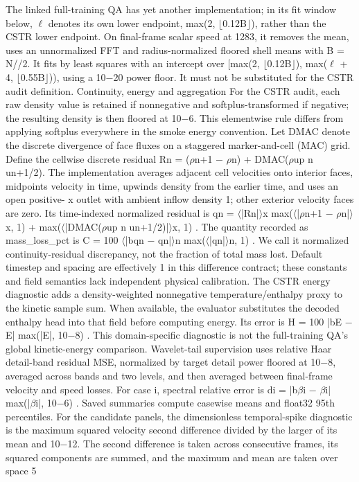 \documentclass[11pt]{article}
\begin{document}
The linked full-training QA has yet another implementation; in its fit window below, \ensuremath{\ell} denotes its
own lower endpoint, max(2, \ensuremath{\lfloor}0.12B\ensuremath{\rfloor}), rather than the CSTR lower endpoint. On final-frame scalar
speed at 1283, it removes the mean, uses an unnormalized FFT and radius-normalized floored shell
means with B = N//2. It fits by least squares with an intercept over [max(2, \ensuremath{\lfloor}0.12B\ensuremath{\rfloor}), max(\ensuremath{\ell} +
4, \ensuremath{\lfloor}0.55B\ensuremath{\rfloor})), using a 10\ensuremath{-}20 power floor. It must not be substituted for the CSTR audit definition.
Continuity, energy and aggregation
For the CSTR audit, each raw density value is retained if nonnegative and softplus-transformed if
negative; the resulting density is then floored at 10\ensuremath{-}6. This elementwise rule differs from applying
softplus everywhere in the smoke energy convention. Let DMAC denote the discrete divergence of
face fluxes on a staggered marker-and-cell (MAC) grid. Define the cellwise discrete residual
Rn = (\ensuremath{\rho}n+1 \ensuremath{-} \ensuremath{\rho}n) + DMAC(\ensuremath{\rho}up
n un+1/2).
The implementation averages adjacent cell velocities onto interior faces, midpoints velocity in time,
upwinds density from the earlier time, and uses an open positive- x outlet with ambient inflow
density 1; other exterior velocity faces are zero. Its time-indexed normalized residual is
qn = \ensuremath{\langle}|Rn|\ensuremath{\rangle}x
max(\ensuremath{\langle}|\ensuremath{\rho}n+1 \ensuremath{-} \ensuremath{\rho}n|\ensuremath{\rangle}x, 1) + max(\ensuremath{\langle}|DMAC(\ensuremath{\rho}up
n un+1/2)|\ensuremath{\rangle}x, 1) .
The quantity recorded as mass\_loss\_pct is
C = 100 \ensuremath{\langle}|bqn \ensuremath{-} qn|\ensuremath{\rangle}n
max(\ensuremath{\langle}|qn|\ensuremath{\rangle}n, 1) .
We call it normalized continuity-residual discrepancy, not the fraction of total mass lost. Default
timestep and spacing are effectively 1 in this difference contract; these constants and field semantics
lack independent physical calibration.
The CSTR energy diagnostic adds a density-weighted nonnegative temperature/enthalpy proxy
to the kinetic sample sum. When available, the evaluator substitutes the decoded enthalpy head
into that field before computing energy. Its error is
H = 100 |bE \ensuremath{-} E|
max(|E|, 10\ensuremath{-}8) .
This domain-specific diagnostic is not the full-training QA’s global kinetic-energy comparison.
Wavelet-tail supervision uses relative Haar detail-band residual MSE, normalized by target detail
power floored at 10\ensuremath{-}8, averaged across bands and two levels, and then averaged between final-frame
velocity and speed losses.
For case i, spectral relative error is
di = |b\ensuremath{\beta}i \ensuremath{-} \ensuremath{\beta}i|
max(|\ensuremath{\beta}i|, 10\ensuremath{-}6) .
Saved summaries compute casewise means and float32 95th percentiles. For the candidate panels,
the dimensionless temporal-spike diagnostic is the maximum squared velocity second difference
divided by the larger of its mean and 10\ensuremath{-}12. The second difference is taken across consecutive
frames, its squared components are summed, and the maximum and mean are taken over space
5
\end{document}
